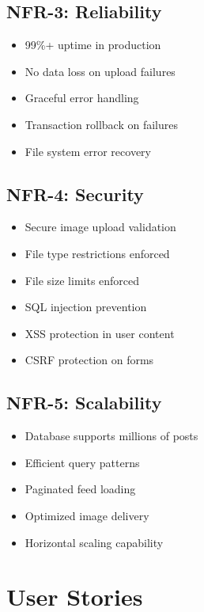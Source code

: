 \documentclass[12pt,a4paper]{report}
\begin{document}
\subsection{NFR-3: Reliability}

\begin{itemize}
    \item 99\%+ uptime in production
    \item No data loss on upload failures
    \item Graceful error handling
    \item Transaction rollback on failures
    \item File system error recovery
\end{itemize}

\subsection{NFR-4: Security}

\begin{itemize}
    \item Secure image upload validation
    \item File type restrictions enforced
    \item File size limits enforced
    \item SQL injection prevention
    \item XSS protection in user content
    \item CSRF protection on forms
\end{itemize}

\subsection{NFR-5: Scalability}

\begin{itemize}
    \item Database supports millions of posts
    \item Efficient query patterns
    \item Paginated feed loading
    \item Optimized image delivery
    \item Horizontal scaling capability
\end{itemize}

\section{User Stories}
\end{document}
